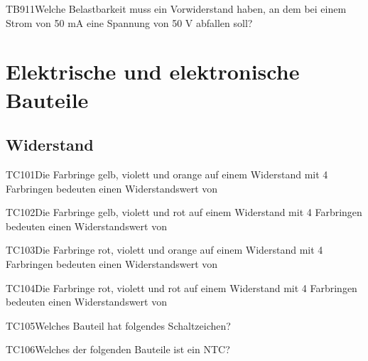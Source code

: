 \begin{question}{TB911}{Welche Belastbarkeit muss ein Vorwiderstand haben, an dem bei einem Strom von 50 mA eine Spannung von 50 V abfallen soll?}
\end{question}

\section{Elektrische und elektronische Bauteile}

\subsection{Widerstand}

\begin{question}{TC101}{Die Farbringe gelb, violett und orange auf einem Widerstand mit 4 Farbringen bedeuten einen Widerstandswert von}
\end{question}

\begin{question}{TC102}{Die Farbringe gelb, violett und rot auf einem Widerstand mit 4 Farbringen bedeuten einen Widerstandswert von}
\end{question}

\begin{question}{TC103}{Die Farbringe rot, violett und orange auf einem Widerstand mit 4 Farbringen bedeuten einen Widerstandswert von}
\end{question}

\begin{question}{TC104}{Die Farbringe rot, violett und rot auf einem Widerstand mit 4 Farbringen bedeuten einen Widerstandswert von}
\end{question}

\begin{question}{TC105}{Welches Bauteil hat folgendes Schaltzeichen?}
\end{question}

\begin{question}{TC106}{Welches der folgenden Bauteile ist ein NTC?}
\end{question}

